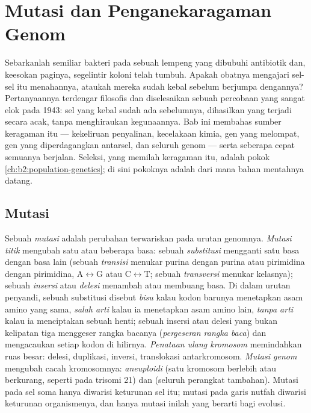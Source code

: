 \chapter{Mutasi dan Penganekaragaman Genom}\label{ch:b2:genome-diversification}

Sebarkanlah semiliar bakteri pada sebuah lempeng yang dibubuhi
antibiotik dan, keesokan paginya, segelintir koloni telah tumbuh.
Apakah obatnya mengajari sel-sel itu menahannya, ataukah mereka sudah
kebal sebelum berjumpa dengannya? Pertanyaannya terdengar filosofis
dan diselesaikan sebuah percobaan yang sangat elok pada 1943: sel yang
kebal sudah ada sebelumnya, dihasilkan  yang terjadi secara
acak, tanpa menghiraukan kegunaannya. Bab ini membahas sumber
keragaman itu --- kekeliruan penyalinan, kecelakaan kimia, gen yang
melompat, gen yang diperdagangkan antarsel,  dan seluruh
genom --- serta seberapa cepat semuanya berjalan. Seleksi, yang memilah
keragaman itu, adalah pokok \cref{ch:b2:population-genetics}; di sini
pokoknya adalah dari mana bahan mentahnya datang.

\section{Mutasi}

\begin{definition}\label{def:b2:genome-diversification:mutation}
Sebuah \emph{mutasi} adalah perubahan terwariskan pada urutan
genomnya. \emph{Mutasi titik} mengubah satu atau beberapa basa: sebuah
\emph{substitusi} mengganti satu basa dengan basa lain (sebuah
\emph{transisi} menukar purina dengan purina atau pirimidina dengan
pirimidina, A$\leftrightarrow$G atau C$\leftrightarrow$T; sebuah
\emph{transversi} menukar kelasnya); sebuah \emph{insersi} atau
\emph{delesi} menambah atau membuang basa. Di dalam urutan penyandi,
sebuah substitusi disebut \emph{bisu} kalau kodon barunya menetapkan
asam amino yang sama, \emph{salah arti} kalau ia menetapkan asam amino
lain, \emph{tanpa arti} kalau ia menciptakan sebuah henti; sebuah
insersi atau delesi yang bukan kelipatan tiga menggeser rangka bacanya
(\emph{pergeseran rangka baca}) dan mengacaukan setiap kodon di
hilirnya. \emph{Penataan ulang kromosom} memindahkan ruas besar:
delesi, duplikasi, inversi, translokasi antarkromosom. \emph{Mutasi
genom} mengubah cacah kromosomnya: \emph{aneuploidi} (satu kromosom
berlebih atau berkurang, seperti pada trisomi 21) dan
\emph{} (seluruh perangkat tambahan). Mutasi
pada sel soma hanya diwarisi keturunan sel itu; mutasi pada garis
nutfah diwarisi keturunan organismenya, dan hanya mutasi inilah yang
berarti bagi evolusi.
\end{definition}

